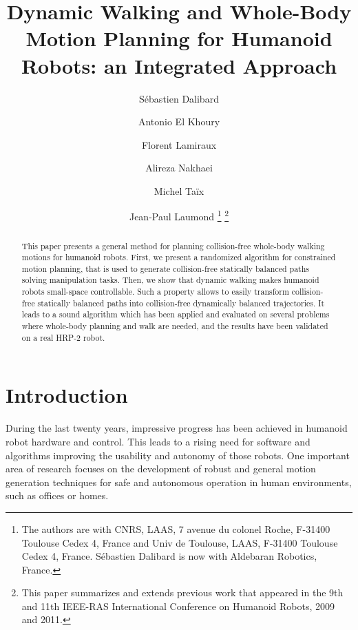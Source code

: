 \documentclass{article}
\begin{document}
\title{Dynamic Walking and Whole-Body Motion Planning for Humanoid Robots: an Integrated Approach}

\author{
  S\'ebastien Dalibard\and
  Antonio El Khoury\and
  Florent Lamiraux\and
  Alireza Nakhaei\and
  Michel Ta\"ix\and
  Jean-Paul Laumond
  \footnote{The authors are with CNRS, LAAS, 7 avenue du colonel
    Roche, F-31400 Toulouse Cedex 4, France and Univ de Toulouse,
    LAAS, F-31400 Toulouse Cedex 4, France. S\'ebastien Dalibard is
    now with Aldebaran Robotics, France.}
  \footnote{
    This paper summarizes and extends previous work that appeared in the 9th and 11th
    IEEE-RAS International Conference on Humanoid Robots, 2009 and 2011.
  }
}

\date{}

\maketitle

\begin{abstract}

This paper presents a general method for planning collision-free whole-body walking motions
for humanoid robots. First, we present a randomized algorithm for constrained motion
planning, that is used to generate collision-free statically balanced paths solving
manipulation tasks. Then, we show that dynamic walking makes humanoid robots 
small-space controllable. Such a property allows to easily transform 
collision-free statically balanced paths into 
collision-free dynamically balanced trajectories. It leads to a sound 
algorithm which has been applied and evaluated on several
problems where whole-body planning and  walk are needed,
and the results have been validated  on a real HRP-2 robot.

\end{abstract}

\section{Introduction}

During the last twenty years, impressive progress has been achieved in humanoid
robot hardware and control. This leads to a rising need for software and algorithms
improving the usability and autonomy of those robots. One important area of research
focuses on the development of robust and general motion generation techniques for safe
and autonomous operation in human environments, such as offices or homes.
\end{document}
